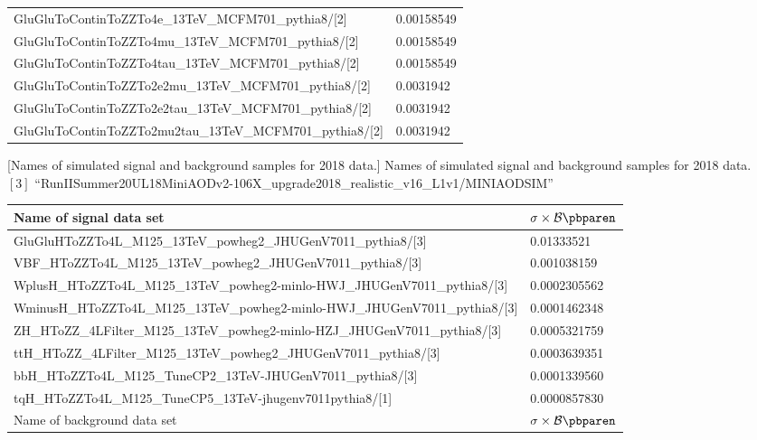 \begin{table}[h]
\begin{tabular}{|ll|}
		GluGluToContinToZZTo4e\_13TeV\_MCFM701\_pythia8/[2]	&	0.00158549	\\
		GluGluToContinToZZTo4mu\_13TeV\_MCFM701\_pythia8/[2]	&	0.00158549	\\
		GluGluToContinToZZTo4tau\_13TeV\_MCFM701\_pythia8/[2]	&	0.00158549	\\
		GluGluToContinToZZTo2e2mu\_13TeV\_MCFM701\_pythia8/[2]	&	0.0031942	\\
		GluGluToContinToZZTo2e2tau\_13TeV\_MCFM701\_pythia8/[2]	&	0.0031942	\\
		GluGluToContinToZZTo2mu2tau\_13TeV\_MCFM701\_pythia8/[2]	&	0.0031942	\\
        \hline
        \end{tabular}
    \label{table:dilep_2017_simSamples}
\end{table}
\begin{table}[h]
    \small
        [Names of simulated signal and background samples for 2018 data.] %
        {Names of simulated signal and background samples for 2018 data. \\ %
        $[3]$ ``RunIISummer20UL18MiniAODv2-106X\_upgrade2018\_realistic\_v16\_L1v1/MINIAODSIM''}
	\begin{tabular}{|ll|}
		\hline      
        Name of signal data set & $\sigma \times \mathcal{B}\pbparen$ \\
        \hline
		GluGluHToZZTo4L\_M125\_13TeV\_powheg2\_JHUGenV7011\_pythia8/[3]	&	0.01333521	\\
		VBF\_HToZZTo4L\_M125\_13TeV\_powheg2\_JHUGenV7011\_pythia8/[3]	&	0.001038159	\\
		WplusH\_HToZZTo4L\_M125\_13TeV\_powheg2-minlo-HWJ\_JHUGenV7011\_pythia8/[3]	&	0.0002305562	\\
		WminusH\_HToZZTo4L\_M125\_13TeV\_powheg2-minlo-HWJ\_JHUGenV7011\_pythia8/[3]	&	0.0001462348	\\
		ZH\_HToZZ\_4LFilter\_M125\_13TeV\_powheg2-minlo-HZJ\_JHUGenV7011\_pythia8/[3]	&	0.0005321759	\\
		ttH\_HToZZ\_4LFilter\_M125\_13TeV\_powheg2\_JHUGenV7011\_pythia8/[3]	&	0.0003639351	\\
		bbH\_HToZZTo4L\_M125\_TuneCP2\_13TeV-JHUGenV7011\_pythia8/[3]	&	0.0001339560	\\
		tqH\_HToZZTo4L\_M125\_TuneCP5\_13TeV-jhugenv7011\-pythia8/[1]	&	0.0000857830	\\
		\hline	
		\hline	
        Name of background data set & $\sigma \times \mathcal{B}\pbparen$ \\

\end{tabular}
\end{table}
